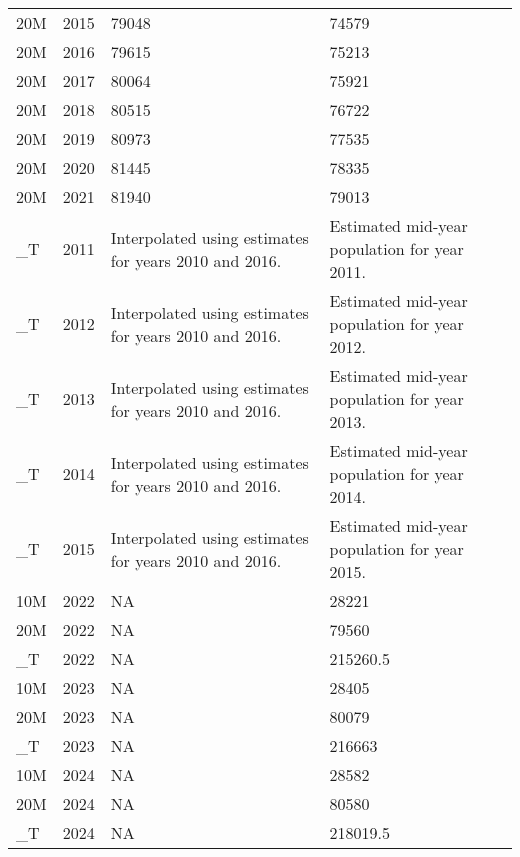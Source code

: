 \begin{longtable}[t]{llll}
20M & 2015 & 79048 & 74579\\
\addlinespace
20M & 2016 & 79615 & 75213\\
20M & 2017 & 80064 & 75921\\
20M & 2018 & 80515 & 76722\\
20M & 2019 & 80973 & 77535\\
20M & 2020 & 81445 & 78335\\
\addlinespace
20M & 2021 & 81940 & 79013\\
\_T & 2011 & Interpolated using estimates for years 2010 and 2016. & Estimated mid-year population for year 2011.\\
\_T & 2012 & Interpolated using estimates for years 2010 and 2016. & Estimated mid-year population for year 2012.\\
\_T & 2013 & Interpolated using estimates for years 2010 and 2016. & Estimated mid-year population for year 2013.\\
\_T & 2014 & Interpolated using estimates for years 2010 and 2016. & Estimated mid-year population for year 2014.\\
\addlinespace
\_T & 2015 & Interpolated using estimates for years 2010 and 2016. & Estimated mid-year population for year 2015.\\
10M & 2022 & NA & 28221\\
20M & 2022 & NA & 79560\\
\_T & 2022 & NA & 215260.5\\
10M & 2023 & NA & 28405\\
\addlinespace
20M & 2023 & NA & 80079\\
\_T & 2023 & NA & 216663\\
10M & 2024 & NA & 28582\\
20M & 2024 & NA & 80580\\
\_T & 2024 & NA & 218019.5\\*
\end{longtable}
